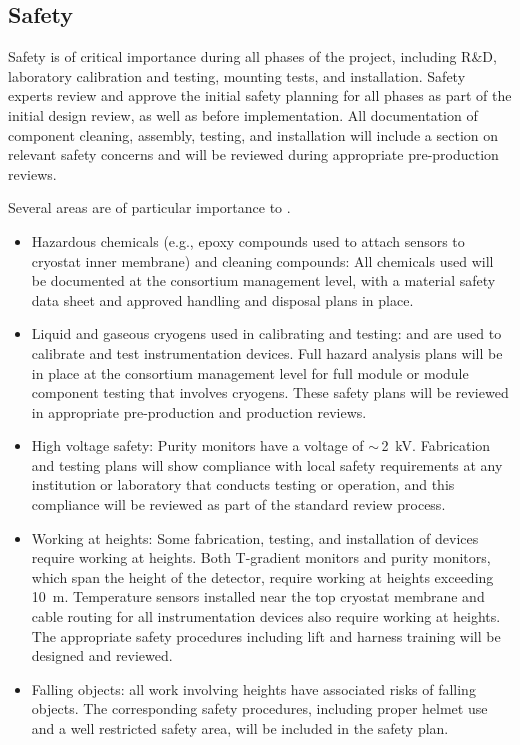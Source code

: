 \subsection{Safety}
Safety %
is of critical importance during %
all phases of the  project, including R\&D, laboratory calibration and testing, mounting tests, and installation. 
Safety experts %
review and approve the initial safety planning for all phases as part of the initial design review, as well as %
before implementation. 
All documentation of component cleaning, assembly, testing, and installation will include a section on relevant safety concerns and will be reviewed during appropriate pre-production reviews.

Several areas are of particular importance to .
\begin{itemize}
\item Hazardous chemicals (e.g., epoxy compounds used to attach sensors to cryostat inner membrane) and cleaning compounds:
  All chemicals used will be documented at the consortium management level, with a material safety data sheet and approved handling and disposal plans in place.

\item Liquid and gaseous cryogens used in calibrating and testing:  and  %
are used to calibrate and test instrumentation devices.
  Full hazard analysis plans will be in place at the consortium management level for full module or
  module component testing that involves  
  cryogens. These safety plans will be reviewed in appropriate pre-production and production reviews.

\item High voltage safety:  Purity monitors %
have a voltage of $\sim\,$\SI{2}{kV}. Fabrication and testing plans will show compliance with local
   safety requirements at %
  any institution or laboratory that conducts testing or operation, and this compliance will be reviewed as part of the standard review process.


\item Working at heights: Some fabrication, testing, and installation of  devices require working at heights.
  Both T-gradient monitors and purity monitors, which span the height of the detector, require working at heights exceeding \SI{10}{m}.
  Temperature sensors installed near the top cryostat membrane and cable routing for all instrumentation devices
  also require working at heights. %
  The appropriate safety procedures including lift and harness training will be designed and reviewed. 
  
\item Falling objects: all work involving heights have associated risks of falling objects. The corresponding safety procedures, including proper helmet use 
and a well restricted safety area, will be included in the safety plan. 
\end{itemize}

